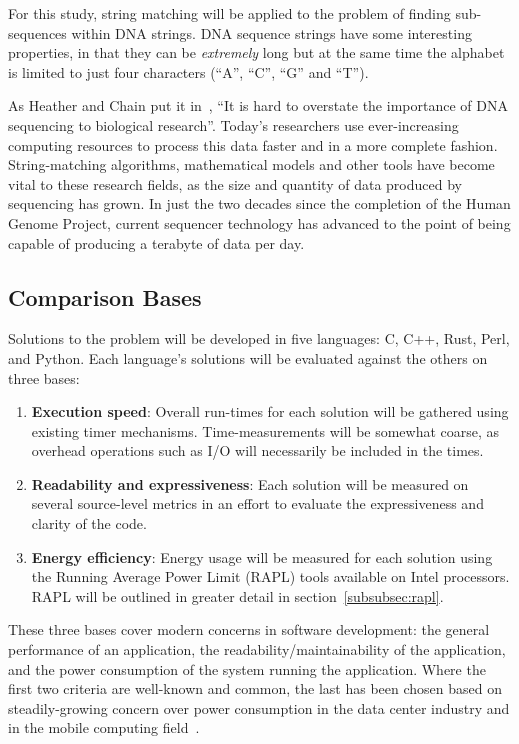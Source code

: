 For this study, string matching will be applied to the problem of finding sub-sequences within DNA strings. DNA sequence strings have some interesting properties, in that they can be \textit{extremely} long but at the same time the alphabet is limited to just four characters (``A'', ``C'', ``G'' and ``T'').

As Heather and Chain put it in~\cite{heather.chain.2016}, ``It is hard to overstate the importance of DNA sequencing to biological research''. Today's researchers use ever-increasing computing resources to process this data faster and in a more complete fashion. String-matching algorithms, mathematical models and other tools have become vital to these research fields, as the size and quantity of data produced by sequencing has grown. In just the two decades since the completion of the Human Genome Project, current sequencer technology has advanced to the point of being capable of producing a terabyte of data per day.

\subsection{Comparison Bases}
\label{subsec:comparison}

Solutions to the problem will be developed in five languages: C, C++, Rust, Perl, and Python. Each language's solutions will be evaluated against the others on three bases:

\begin{enumerate}
\item \textbf{Execution speed}: Overall run-times for each solution will be gathered using existing timer mechanisms. Time-measurements will be somewhat coarse, as overhead operations such as I/O will necessarily be included in the times.
\item \textbf{Readability and expressiveness}: Each solution will be measured on several source-level metrics in an effort to evaluate the expressiveness and clarity of the code.
\item \textbf{Energy efficiency}: Energy usage will be measured for each solution using the Running Average Power Limit (RAPL) tools available on Intel processors. RAPL will be outlined in greater detail in section~\ref{subsubsec:rapl}.
\end{enumerate}

These three bases cover modern concerns in software development: the general performance of an application, the readability/maintainability of the application, and the power consumption of the system running the application. Where the first two criteria are well-known and common, the last has been chosen based on steadily-growing concern over power consumption in the data center industry and in the mobile computing field~\cite{pereira.et.al.2017}.
